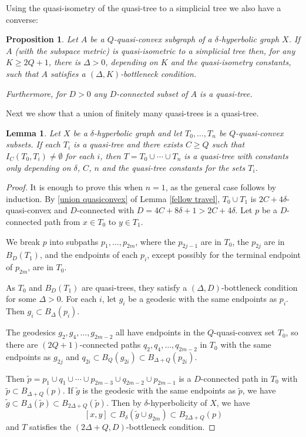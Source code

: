 \documentclass[11pt]{article}
\newtheorem{lemma}[thm]{Lemma}
\newtheorem{prop}[thm]{Proposition}
\theoremstyle{remark}
\begin{document}
Using the quasi-isometry of the quasi-tree to a simplicial tree we also have a converse:
\begin{prop}\label{bottleneck_converse}
Let $A$ be a $Q$-quasi-convex subgraph of a $\delta$-hyperbolic graph $X$. If $A$
(with the subspace metric) is quasi-isometric to a simplicial tree then,
for any $K\ge 2Q+1$, there is $\Delta>0$, depending on $K$ and the quasi-isometry constants, such that $A$ satisfies a $(\Delta, K)$-bottleneck condition.

Furthermore, for $D>0$ any $D$-connected subset of $A$ is a quasi-tree.
\end{prop}


Next we show that a union of finitely many quasi-trees is a quasi-tree.
\begin{lemma}\label{finite quasitree}
Let $X$ be a $\delta$-hyperbolic graph and  let $T_0,\dots, T_n$ be $Q$-quasi-convex subsets. If each $T_i$ is a quasi-tree and there exists $C\ge Q$ such that $I_C(T_0, T_i) \neq \emptyset$ for each $i$, then $T = T_0 \cup \cdots \cup T_n$ is a quasi-tree with constants only depending on $\delta$, $C$, $n$ and the quasi-tree constants for the sets $T_i$.
\end{lemma}

\begin{proof}
It is enough to prove this when $n=1$, as the general case follows by induction.  By \eqref{union quasiconvex} of Lemma \ref{fellow travel},  $T_0 \cup T_1$ is $2C+ 4\delta$-quasi-convex and $D$-connected with $D = 4C+ 8\delta +1>2C+4\delta$. Let $p$ be a $D$-connected path from $x \in T_0$ to $y \in T_1$.

We break $p$ into subpaths $p_1, \dots, p_{2m}$, where the $p_{2j-1}$ are in $T_0$, the $p_{2j}$ are in $B_D(T_1)$, and the endpoints of each $p_i$, except possibly for the terminal endpoint of $p_{2m}$, are in $T_0$.

As $T_0$ and $B_D(T_1)$ are quasi-trees, they satisfy a $(\Delta, D)$-bottleneck condition for some $\Delta>0$.
For each $i$, let $g_i$ be a geodesic with the same endpoints as $p_i$.
Then $g_i \subset B_\Delta(p_i)$.

The geodesics $g_2, g_4, \dots, g_{2m-2}$ all have endpoints in the $Q$-quasi-convex set $T_0$, so there are $(2Q+1)$-connected paths $q_2, q_4, \dots, q_{2m-2}$ in $T_0$ with the same endpoints as $g_{2j}$ and $q_{2i} \subset B_Q(g_{2i}) \subset B_{\Delta + Q}(p_{2i})$.

Then $\tilde p = p_1 \cup q_1 \cup \cdots \cup p_{2m-3} \cup q_{2m-2} \cup p_{2m-1}$ is a $D$-connected path in $T_0$ with $\tilde p \subset B_{\Delta+Q}(p)$. If $\tilde g$ is the geodesic with the same endpoints as $\tilde p$, we have $\tilde g \subset B_\Delta(\tilde p) \subset B_{2\Delta + Q}(\tilde p)$. Then by $\delta$-hyperbolicity of $X$, we have
$$[x,y] \subset B_\delta(\tilde g \cup g_{2m}) \subset B_{2\Delta +Q}(p)$$
and $T$ satisfies the $(2\Delta + Q, D)$-bottleneck condition. 
\end{proof}
\end{document}
